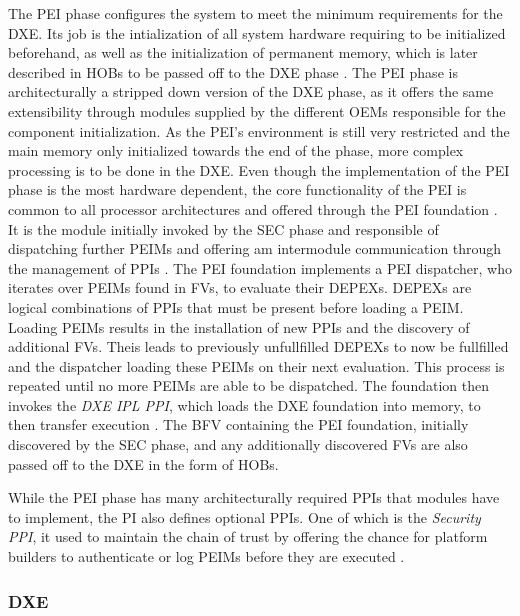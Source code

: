 The \ac{PEI} phase configures the system to meet the minimum requirements for the \ac{DXE}.
Its job is the intialization of all system hardware requiring to be initialized beforehand, as well as the initialization of permanent memory, which is later described in \acp{HOB} to be passed off to the \ac{DXE} phase \cite[Vol. 1, 2.1]{pi-spec}.
The \ac{PEI} phase is architecturally a stripped down version of the \ac{DXE} phase, as it offers the same extensibility through modules supplied by the different \acp{OEM} responsible for the component initialization.
As the \ac{PEI}'s environment is still very restricted and the main memory only initialized towards the end of the phase, more complex processing is to be done in the \ac{DXE}.
Even though the implementation of the \ac{PEI} phase is the most hardware dependent, the core functionality of the \ac{PEI} is common to all processor architectures and offered through the \ac{PEI} foundation \cite[Vol. 1, 2.2]{pi-spec}.
It is the module initially invoked by the \ac{SEC} phase and responsible of dispatching further \acp{PEIM} and offering am intermodule communication through the management of \acp{PPI} \cite[Vol. 1, 2.5]{pi-spec}.
The \ac{PEI} foundation implements a \ac{PEI} dispatcher, who iterates over \acp{PEIM} found in \acp{FV}, to evaluate their \acp{DEPEX}.
\acp{DEPEX} are logical combinations of \acp{PPI} that must be present before loading a \ac{PEIM}.
Loading \acp{PEIM} results in the installation of new \acp{PPI} and the discovery of additional \acp{FV}.
Theis leads to previously unfullfilled \acp{DEPEX} to now be fullfilled and the dispatcher loading these \acp{PEIM} on their next evaluation.
This process is repeated until no more \acp{PEIM} are able to be dispatched.
The foundation then invokes the \emph{\ac{DXE} IPL \ac{PPI}}, which loads the \ac{DXE} foundation into memory, to then transfer execution \cite[Vol. 1, 2.6]{pi-spec}.
The \ac{BFV} containing the \ac{PEI} foundation, initially discovered by the \ac{SEC} phase, and any additionally discovered \acp{FV} are also passed off to the \ac{DXE} in the form of \acp{HOB}.

While the \ac{PEI} phase has many architecturally required \acp{PPI} that modules have to implement, the \ac{PI} also defines optional \acp{PPI}.
One of which is the \emph{Security PPI}, it used to maintain the chain of trust by offering the chance for platform builders to authenticate or log \acp{PEIM} before they are executed \cite[Vol. 1, 6.3.6]{pi-spec}.


\subsubsection{\acf{DXE}}

